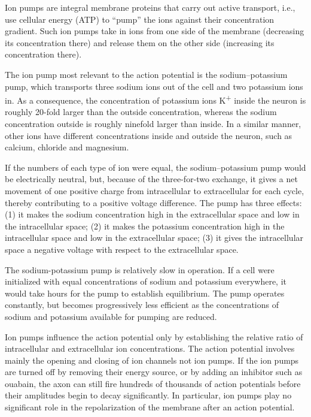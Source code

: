 \documentclass[]{book}
\begin{document}
Ion pumps are integral membrane proteins that carry out active transport, i.e., use cellular energy (ATP) to ``pump'' the ions against their concentration gradient. Such ion pumps take in ions from one side of the membrane (decreasing its concentration there) and release them on the other side (increasing its concentration there).

The ion pump most relevant to the action potential is the sodium--potassium pump, which transports three sodium ions out of the cell and two potassium ions in. As a consequence, the concentration of potassium ions K\textsuperscript{+} inside the neuron is roughly 20-fold larger than the outside concentration, whereas the sodium concentration outside is roughly ninefold larger than inside. In a similar manner, other ions have different concentrations inside and outside the neuron, such as calcium, chloride and magnesium.

If the numbers of each type of ion were equal, the sodium--potassium pump would be electrically neutral, but, because of the three-for-two exchange, it gives a net movement of one positive charge from intracellular to extracellular for each cycle, thereby contributing to a positive voltage difference. The pump has three effects: (1) it makes the sodium concentration high in the extracellular space and low in the intracellular space; (2) it makes the potassium concentration high in the intracellular space and low in the extracellular space; (3) it gives the intracellular space a negative voltage with respect to the extracellular space.

The sodium-potassium pump is relatively slow in operation. If a cell were initialized with equal concentrations of sodium and potassium everywhere, it would take hours for the pump to establish equilibrium. The pump operates constantly, but becomes progressively less efficient as the concentrations of sodium and potassium available for pumping are reduced.

Ion pumps influence the action potential only by establishing the relative ratio of intracellular and extracellular ion concentrations. The action potential involves mainly the opening and closing of ion channels not ion pumps. If the ion pumps are turned off by removing their energy source, or by adding an inhibitor such as ouabain, the axon can still fire hundreds of thousands of action potentials before their amplitudes begin to decay significantly. In particular, ion pumps play no significant role in the repolarization of the membrane after an action potential.
\end{document}
